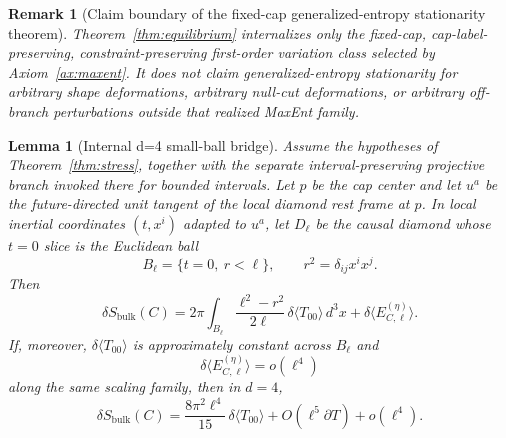 \documentclass[11pt]{article}
\newtheorem{lemma}[theorem]{Lemma}
\newtheorem{remark}[theorem]{Remark}
\begin{document}
\begin{remark}[Claim boundary of the fixed-cap generalized-entropy stationarity theorem]
Theorem~\ref{thm:equilibrium} internalizes only the fixed-cap, cap-label-preserving, constraint-preserving first-order variation class selected by Axiom~\ref{ax:maxent}. It does not claim generalized-entropy stationarity for arbitrary shape deformations, arbitrary null-cut deformations, or arbitrary off-branch perturbations outside that realized MaxEnt family.
\end{remark}

\begin{lemma}[Internal d=4 small-ball bridge]\label{lem:smallball}
Assume the hypotheses of Theorem~\ref{thm:stress}, together with the separate interval-preserving projective branch invoked there for bounded intervals. Let $p$ be the cap center and let $u^a$ be the future-directed unit tangent of the local diamond rest frame at $p$. In local inertial coordinates $(t,x^i)$ adapted to $u^a$, let $D_\ell$ be the causal diamond whose $t=0$ slice is the Euclidean ball
\[
B_\ell=\{t=0,\ r<\ell\},
\qquad
r^2=\delta_{ij}x^ix^j.
\]
Then
\[
\delta S_{\mathrm{bulk}}(C)
=
2\pi\int_{B_\ell}\frac{\ell^2-r^2}{2\ell}\,\delta\langle T_{00}\rangle\,d^3x
+
\delta\langle E^{(\eta)}_{C,\ell}\rangle.
\]
If, moreover, $\delta\langle T_{00}\rangle$ is approximately constant across $B_\ell$ and
\[
\delta\langle E^{(\eta)}_{C,\ell}\rangle=o(\ell^4)
\]
along the same scaling family, then in $d=4$,
\[
\delta S_{\mathrm{bulk}}(C)
=
\frac{8\pi^2\ell^4}{15}\,\delta\langle T_{00}\rangle
+O(\ell^5\partial T)+o(\ell^4).
\]
\end{lemma}
\end{document}

